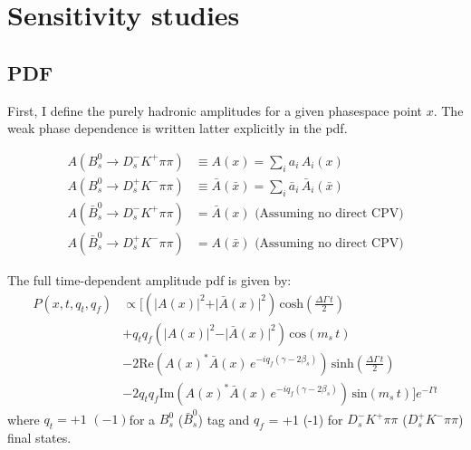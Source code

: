 
\section{Sensitivity studies}


\subsection{PDF}

First, I define the purely hadronic amplitudes for a given phasespace point $x$.
The weak phase dependence is written latter explicitly in the pdf.


\begin{align}
	A(B_s^0 \to D_s^{-} K^{+} \pi\pi) &\equiv A(x) = \sum_i a_i \, A_i(x)   \\
	A(B_s^0 \to D_s^{+} K^{-} \pi\pi) &\equiv \bar A(\bar x) = \sum_i \bar a_i \,\bar A_i(\bar x)    \\
	A(\bar B_s^0 \to D_s^{-} K^{+} \pi\pi) &= \bar A(x)  \, \, \text{(Assuming no direct CPV)} \\
	A(\bar B_s^0 \to D_s^{+} K^{-} \pi\pi) &= A(\bar x)  \, \, \text{(Assuming no direct CPV)} 
\end{align}

The full time-dependent amplitude pdf is given by:
\begin{align*}
	P(x,t,q_t,q_f) &\propto  [
	 \left( \vert A(x) \vert^2 + \vert \bar A(x) \vert^2 \right) \, \text{cosh} \left( \frac{\Delta \Gamma \, t}{2}\right) \\
	 & + q_t q_f \left( \vert A(x) \vert^2 - \vert \bar A(x) \vert^2 \right) \, \text{cos} \left( m_s \, t \right)  \\
	 & -2 \text{Re}\left( A(x)^{*}  \bar A(x) \, e^{-i q_f (\gamma - 2\beta_s)}  \right) \, \text{sinh} \left( \frac{\Delta \Gamma \, t}{2}\right)  \\
	 & -2 q_t q_f \text{Im}\left( A(x)^{*}  \bar A(x) \, e^{-i q_f (\gamma - 2\beta_s)}  \right)\, \text{sin} \left( m_s \, t \right)  ]  e^{- \Gamma t}
\end{align*}
where $q_t = +1$ $(-1) $for a $B_s^{0}$ ($\bar B_s^{0}$) tag and 
$q_f$ = +1 $ $(-1) for $D_s^{-} K^{+} \pi\pi$ ($D_s^{+} K^{-} \pi\pi$) final states. \\

